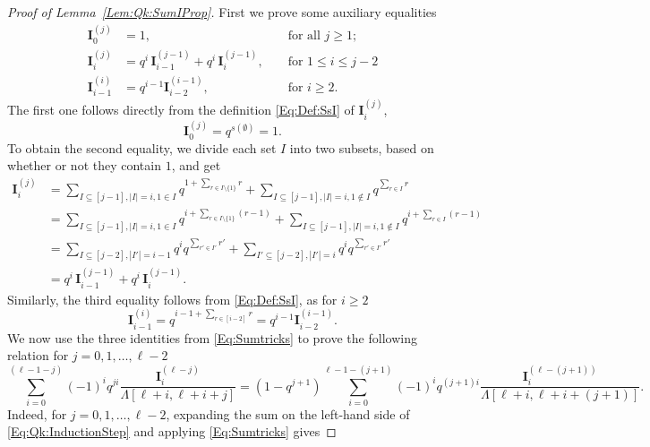 \documentclass[letterpaper,11pt]{article}
\theoremstyle{definition}
\theoremstyle{remark}
\renewcommand{\le}{\leqslant}
\renewcommand{\ge}{\geqslant}
\newcommand{\product}{\Lambda}
\newcommand{\sumI}{\mathbf{I}}
\begin{document}
\begin{proof}[Proof of Lemma~\ref{Lem:Qk:SumIProp}]
	First we prove some auxiliary equalities
	\begin{equation}\label{Eq:Sumtricks}	\begin{aligned}
			\sumI^{(j)}_{0}&=1, &&\text{ for all }j\ge 1;\\
			\sumI^{(j)}_{i}&=q^{i}\,\sumI^{(j-1)}_{i-1} + q^{i}\,\sumI^{(j-1)}_{i}, &&\text{ for } 1 \le i \le j-2\\
			\sumI^{(i)}_{i-1}&=q^{i-1}\sumI^{(i-1)}_{i-2}, &&\text{ for }i\ge 2.
		\end{aligned} 
	\end{equation}
	The first one follows directly from the definition \eqref{Eq:Def:SsI} of $\sumI^{(j)}_{i}$, 
	\[
	\sumI^{(j)}_{0}=q^{s(\emptyset)}=1.
	\]
	To obtain the second equality, we divide each set $I$ into two subsets, based on whether or not they contain $1$, and get
	\begin{equation*}
		\begin{split}
			\sumI^{(j)}_{i}
			&=\sum_{I\subseteq [j-1],|I|=i, 1\in I}q^{1+\sum_{r\in I\setminus\{1\}}r} + \sum_{I\subseteq [j-1],|I|=i, 1\notin I}q^{\sum_{r\in I}r} \\
			&=\sum_{I\subseteq [j-1],|I|=i, 1\in I}q^{i+\sum_{r\in I\setminus\{1\}}(r-1)} + \sum_{I\subseteq [j-1],|I|=i, 1\notin I}q^{i+\sum_{r\in I}(r-1)}\\ 
			&=\sum_{I\subseteq [j-2],|I'|=i-1}q^iq^{\sum_{r'\in I'}r'} + \sum_{I'\subseteq [j-2],|I'|=i}q^iq^{\sum_{r'\in I'}r'}\\ 
			&=q^{i}\,\sumI^{(j-1)}_{i-1} + q^{i}\,\sumI^{(j-1)}_{i}.
		\end{split}
	\end{equation*}
	Similarly, the third equality follows from \eqref{Eq:Def:SsI}, as for $i\ge 2$
	\begin{equation*}
		\sumI^{(i)}_{i-1}=q^{i-1+\sum_{r\in [i-2]}r}=q^{i-1}\sumI^{(i-1)}_{i-2}.
	\end{equation*} 
	We now use the three identities from \eqref{Eq:Sumtricks} to prove the following relation for $j=0,1,\ldots,\ell-2$
	\begin{equation}\label{Eq:Qk:InductionStep}
		\sum_{i=0}^{(\ell-1-j)}(-1)^{i}q^{ji}\frac{\sumI_{i}^{(\ell-j)}}{\product[\ell+i,\ell+i+j]}
		=
		(1-q^{j+1})\sum_{i=0}^{\ell-1-(j+1)}(-1)^{i}q^{(j+1)i}\frac{\sumI_{i}^{(\ell-(j+1))}}{\product[\ell+i,\ell+i+(j+1)]}.
	\end{equation}
	Indeed, for $j=0,1,\ldots,\ell-2$, expanding the sum on the left-hand side of \eqref{Eq:Qk:InductionStep} and applying \eqref{Eq:Sumtricks} gives

\end{proof}
\end{document}

